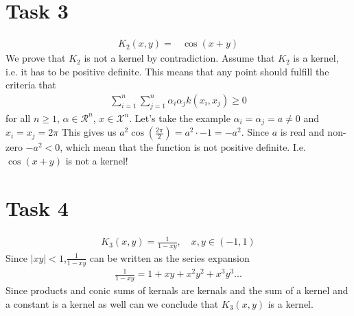\documentclass{article}
\begin{document}
\section*{Task 3}
\begin{align}
	K_2(x,y) =& \cos(x+y)
\end{align}
We prove that $K_2$ is not a kernel by contradiction. Assume that $K_2$ is a kernel, i.e. it has to be positive definite. This means that any point should fulfill the criteria that 
\begin{align}
	\sum_{i=1}^{n}\sum_{j=1}^{n} \alpha_i\alpha_j k(x_i,x_j) \geq 0
\end{align}
for all $n \geq 1$, $\alpha \in \mathcal{R}^n$, $x \in \mathcal{X}^n$. Let's take the example $\alpha_i = \alpha_j = a \neq 0 $ and $x_i=x_j=2\pi$ This gives us $a^2 \cos(\frac{2\pi}{2}) = a^2\cdot -1 = -a^2$. Since $a$ is real and non-zero $-a^2<0$, which mean that the function is not positive definite.
I.e. $\cos(x+y)$ is not a kernel!

\section*{Task 4}
\begin{align}
	K_3(x,y) = \frac{1}{1-xy}, \quad x,y\in (-1,1)
\end{align}
Since $|xy|<1$,$ \frac{1}{1-xy}$ can be written as the series expansion
\begin{align}
	 \frac{1}{1-xy} = 1 + xy + x^2y^2+x^3y^3...
\end{align}
Since products and conic sums of kernals are kernals and the sum of a kernel and a constant is a kernel as well can we conclude that $K_3(x,y)$ is a kernel.
\end{document}
